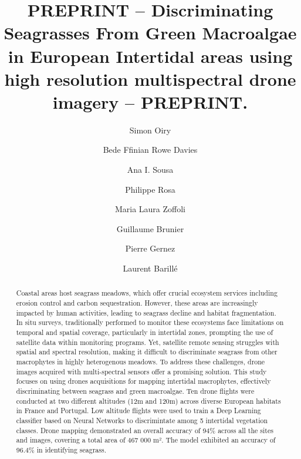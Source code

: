 \documentclass[
  number]{elsarticle}
\begin{document}
\begin{frontmatter}
\title{PREPRINT -- Discriminating Seagrasses From Green Macroalgae in
European Intertidal areas using high resolution multispectral drone
imagery -- PREPRINT.}
\author[1]{Simon Oiry%
%
}
\author[1]{Bede Ffinian Rowe Davies%
%
}

\author[2]{Ana I. Sousa%
%
}

\author[1]{Philippe Rosa%
%
}

\author[3]{Maria Laura Zoffoli%
%
}

\author[4]{Guillaume Brunier%
%
}

\author[1]{Pierre Gernez%
%
}

\author[1]{Laurent Barillé%
%
}











        
\begin{abstract}
Coastal areas host seagrass meadows, which offer crucial ecosystem
services including erosion control and carbon sequestration. However,
these areas are increasingly impacted by human activities, leading to
seagrass decline and habitat fragmentation. In situ surveys,
traditionally performed to monitor these ecosystems face limitations on
temporal and spatial coverage, particularly in intertidal zones,
prompting the use of satellite data within monitoring programs. Yet,
satellite remote sensing struggles with spatial and spectral resolution,
making it difficult to discriminate seagrass from other macrophytes in
highly heterogenous meadows. To address these challenges, drone images
acquired with multi-spectral sensors offer a promising solution. This
study focuses on using drones acquisitions for mapping intertidal
macrophytes, effectively discriminating between seagrass and green
macroalgae. Ten drone flights were conducted at two different altitudes
(12m and 120m) across diverse European habitats in France and Portugal.
Low altitude flights were used to train a Deep Learning classifier based
on Neural Networks to discrimintate among 5 intertidal vegetation
classes. Drone mapping demonstrated an overall accuracy of 94\% across
all the sites and images, covering a total area of 467 000 m². The model
exhibited an accuracy of 96.4\% in identifying seagrass.
\end{abstract}






\end{frontmatter}
\end{document}
